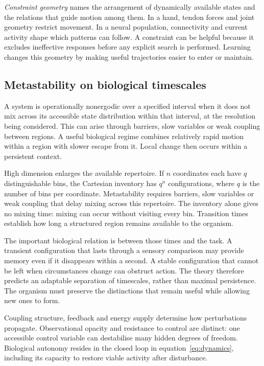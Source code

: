 \documentclass[11pt,a4paper]{article}
\begin{document}
\emph{Constraint geometry} names the arrangement of dynamically available states and the relations that guide motion among them. In a hand, tendon forces and joint geometry restrict movement. In a neural population, connectivity and current activity shape which patterns can follow. A constraint can be helpful because it excludes ineffective responses before any explicit search is performed. Learning changes this geometry by making useful trajectories easier to enter or maintain.

\subsection{Metastability on biological timescales}

A system is operationally nonergodic over a specified interval when it does not mix across its accessible state distribution within that interval, at the resolution being considered. This can arise through barriers, slow variables or weak coupling between regions. A useful biological regime combines relatively rapid motion within a region with slower escape from it. Local change then occurs within a persistent context.

High dimension enlarges the available repertoire. If \(n\) coordinates each have \(q\) distinguishable bins, the Cartesian inventory has \(q^n\) configurations, where \(q\) is the number of bins per coordinate. Metastability requires barriers, slow variables or weak coupling that delay mixing across this repertoire. The inventory alone gives no mixing time: mixing can occur without visiting every bin. Transition times establish how long a structured region remains available to the organism.

The important biological relation is between those times and the task. A transient configuration that lasts through a sensory comparison may provide memory even if it disappears within a second. A stable configuration that cannot be left when circumstances change can obstruct action. The theory therefore predicts an adaptable separation of timescales, rather than maximal persistence. The organism must preserve the distinctions that remain useful while allowing new ones to form.

Coupling structure, feedback and energy supply determine how perturbations propagate. Observational opacity and resistance to control are distinct: one accessible control variable can destabilise many hidden degrees of freedom. Biological autonomy resides in the closed loop in equation~\eqref{eq:dynamics}, including its capacity to restore viable activity after disturbance.
\end{document}
